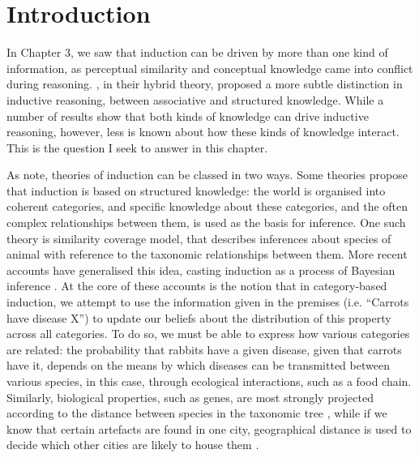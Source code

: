 
\section{Introduction}

In Chapter 3, we saw that 
induction can be driven by more than one kind of information,
as perceptual similarity and conceptual knowledge
came into conflict during reasoning.
\citet{Bright2014a}, in their hybrid theory,
proposed a more subtle distinction in inductive reasoning,
between associative and structured knowledge.
While a number of results show that both kinds of knowledge
can drive inductive reasoning, however,
less is known about how these kinds of knowledge interact.
This is the question I seek to answer in this chapter.

As \citet{Bright2014a} note,
theories of induction can be classed in two ways.
Some theories propose that induction is based on structured knowledge:
the world is organised into coherent categories,
and specific knowledge about these categories,
and the often complex relationships between them,
is used as the basis for inference.
One such theory is  similarity coverage model,
that describes inferences about species of animal
with reference to the taxonomic relationships between them.
More recent accounts have generalised this idea,
casting induction as a process of Bayesian inference
\citep{Griffiths2009,Griffiths2005,Heit1998,Kemp2009}.
At the core of these accounts is the notion that
in category-based induction,
we attempt to use the information given in the premises
(i.e. ``Carrots have disease X'')
to update our beliefs about the distribution of this property
across all categories.
To do so, we must be able to express how various categories are related:
the probability that rabbits have a given disease, given that carrots have it,
depends on the means by which diseases can be transmitted between various species,
in this case, through ecological interactions, such as a food chain.
Similarly, biological properties, such as genes,
are most strongly projected according to 
the distance between species in the taxonomic tree \citep{Heit1998,Osherson1990},
while if we know that certain artefacts are found in one city,
geographical distance is used to decide which other cities are likely to
house them \citep{Kemp2009}.

